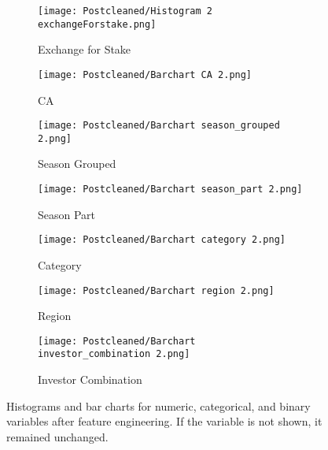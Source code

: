 \documentclass{article}
\begin{document}
\begin{figure}[H]
    \centering
    \begin{subfigure}[b]{0.45\textwidth}
        \texttt{[image: Postcleaned/Histogram 2 exchangeForstake.png]} %
        \caption{Exchange for Stake}
        \label{fig:exchangeForStake}
    \end{subfigure}
    \hfill
    \begin{subfigure}[b]{0.45\textwidth}
        \texttt{[image: Postcleaned/Barchart CA 2.png]} %
        \caption{CA}
        \label{fig:CA}
    \end{subfigure}

    \begin{subfigure}[b]{0.45\textwidth}
        \texttt{[image: Postcleaned/Barchart season\_grouped 2.png]} %
        \caption{Season Grouped}
        \label{fig:season_grouped}
    \end{subfigure}
    \hfill
    \begin{subfigure}[b]{0.45\textwidth}
        \texttt{[image: Postcleaned/Barchart season\_part 2.png]} %
        \caption{Season Part}
        \label{fig:season_part}
    \end{subfigure}

    \begin{subfigure}[b]{0.3\textwidth}
        \texttt{[image: Postcleaned/Barchart category 2.png]} %
        \caption{Category}
        \label{fig:category}
    \end{subfigure}
    \hfill
    \begin{subfigure}[b]{0.3\textwidth}
        \texttt{[image: Postcleaned/Barchart region 2.png]} %
        \caption{Region}
        \label{fig:region}
    \end{subfigure}
    \hfill
    \begin{subfigure}[b]{0.3\textwidth}
        \texttt{[image: Postcleaned/Barchart investor\_combination 2.png]} %
        \caption{Investor Combination}
        \label{fig:investor_combination}
    \end{subfigure}

    \caption{Histograms and bar charts for numeric, categorical, and binary variables after feature engineering. If the variable is not shown, it remained unchanged.}
    \label{fig:combined_appendix}
\end{figure}
\end{document}

